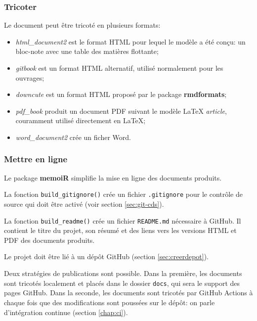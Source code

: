 \documentclass[
  12pt,
  french,
  a4paper,
  extrafontsizes,onecolumn,openright
  ]{memoir}
\providecommand{\tightlist}{%
  \setlength{\itemsep}{0pt}\setlength{\parskip}{0pt}}
\begin{document}
\hypertarget{tricoter}{%
\subsubsection{Tricoter}\label{tricoter}}

Le document peut être tricoté en plusieurs formats:

\begin{itemize}
\tightlist
\item
  \emph{html\_document2} est le format HTML pour lequel le modèle a été conçu: un bloc-note avec une table des matières flottante;
\item
  \emph{gitbook} est un format HTML alternatif, utilisé normalement pour les ouvrages;
\item
  \emph{downcute} est un format HTML proposé par le package \textbf{rmdformats};
\item
  \emph{pdf\_book} produit un document PDF suivant le modèle LaTeX \emph{article}, couramment utilisé directement en LaTeX;
\item
  \emph{word\_document2} crée un ficher Word.
\end{itemize}

\hypertarget{sec:article-en-ligne}{%
\subsubsection{Mettre en ligne}\label{sec:article-en-ligne}}

Le package \textbf{memoiR} simplifie la mise en ligne des documents produits.

La fonction \texttt{build\_gitignore()} crée un fichier \texttt{.gitignore} pour le contrôle de source qui doit être activé (voir section \ref{sec:git-cds}).

La fonction \texttt{build\_readme()} crée un fichier \texttt{README.md} nécessaire à GitHub.
Il contient le titre du projet, son résumé et des liens vers les versions HTML et PDF des documents produits.

Le projet doit être lié à un dépôt GitHub (section \ref{sec:creerdepot}).

Deux stratégies de publications sont possible.
Dans la première, les documents sont tricotés localement et placés dans le dossier \texttt{docs}, qui sera le support des pages GitHub.
Dans la seconde, les documents sont tricotés par GitHub Actions à chaque fois que des modifications sont poussées sur le dépôt: on parle d'intégration continue (section \ref{chap:ci}).
\end{document}
